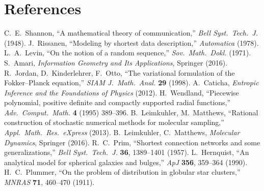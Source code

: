 \documentclass[11pt,a4paper]{article}
\numberwithin{equation}{section}
\begin{document}
\section*{References}
\begin{thebibliography}{12}
C.\ E.\ Shannon, ``A mathematical theory of communication,'' \emph{Bell Syst.\ Tech.\ J.} (1948).
J.\ Rissanen, ``Modeling by shortest data description,'' \emph{Automatica} (1978).
L.\ A.\ Levin, ``On the notion of a random sequence,'' \emph{Sov.\ Math.\ Dokl.} (1971).
S.\ Amari, \emph{Information Geometry and Its Applications}, Springer (2016).
R.\ Jordan, D.\ Kinderlehrer, F.\ Otto, ``The variational formulation of the Fokker--Planck equation,'' \emph{SIAM J.\ Math.\ Anal.} \textbf{29} (1998).
A.\ Caticha, \emph{Entropic Inference and the Foundations of Physics} (2012).
H.\ Wendland, ``Piecewise polynomial, positive definite and compactly supported radial functions,'' \emph{Adv.\ Comput.\ Math.} \textbf{4} (1995) 389--396.
B.\ Leimkuhler, M.\ Matthews, ``Rational construction of stochastic numerical methods for molecular sampling,'' \emph{Appl.\ Math.\ Res.\ eXpress} (2013).
B.\ Leimkuhler, C.\ Matthews, \emph{Molecular Dynamics}, Springer (2016).
R.\ C.\ Prim, ``Shortest connection networks and some generalizations,'' \emph{Bell Syst.\ Tech.\ J.} \textbf{36}, 1389--1401 (1957).
L.\ Hernquist, ``An analytical model for spherical galaxies and bulges,'' \emph{ApJ} \textbf{356}, 359--364 (1990).
H.\ C.\ Plummer, ``On the problem of distribution in globular star clusters,'' \emph{MNRAS} \textbf{71}, 460--470 (1911).
\end{thebibliography}
\end{document}
